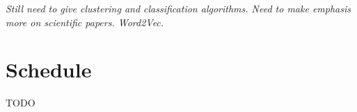 \documentclass[11pt]{article}
\begin{document}
\begin{framed}
\emph{Still need to give clustering and classification algorithms. Need to make emphasis more on scientific papers. Word2Vec.}
\end{framed}

\section{Schedule}

TODO


\nocite{*}



  
  
\end{document}
